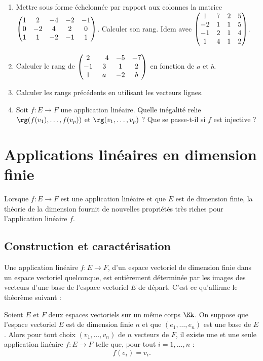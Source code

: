 \documentclass[class=report,crop=false]{standalone}
\begin{document}
\begin{miniexercices}
\begin{enumerate}
  \item Mettre sous forme échelonnée par rapport aux colonnes la matrice
  $\begin{pmatrix} 1 &2  &-4 &-2 &-1 \cr
                0 &-2 &4  &2  &0  \cr
                1 &1  &-2 &-1 &1  \cr \end{pmatrix}$. Calculer son rang.
                Idem avec
                $\begin{pmatrix} 1  &7  &2  &5  \cr
                -2 &1  &1  &5  \cr
                -1 &2  &1  &4  \cr
                1  &4  &1  &2  \cr \end{pmatrix}$.

  \item Calculer le rang de $\begin{pmatrix} 2&\phantom-4&-5&-7 \cr -1&3&1&2 \cr 1&a&-2&b \end{pmatrix}$ en fonction de
$a$ et $b$.

  \item Calculer les rangs précédents en utilisant les vecteurs lignes.

  \item Soit $f:E \to F$ une application linéaire.
Quelle inégalité relie $\rg (f(v_1), \ldots ,f(v_p))$
et $\rg (v_1, \ldots , v_p)$ ? Que se passe-t-il si $f$ est injective ?

\end{enumerate}
\end{miniexercices}




\section{Applications linéaires en dimension finie}

Lorsque $f : E \to F$ est une application linéaire et que $E$ est de dimension finie,
la théorie de la dimension fournit de nouvelles propriétés très
riches pour l'application linéaire $f$.

\subsection{Construction et caractérisation}

Une application linéaire $f : E \to F$, d'un espace vectoriel de dimension finie dans un
espace vectoriel quelconque, est entièrement déterminée par les
images des vecteurs d'une base de l'espace vectoriel $E$ de départ.
C'est ce qu'affirme le théorème suivant :
\begin{theoreme}
Soient $E$ et $F$ deux espaces vectoriels sur un même corps $\Kk$.
On suppose que l'espace vectoriel $E$ est de dimension finie $n$
et que $(e_1,\dots,e_n)$ est une base de $E$.
Alors pour tout choix $(v_1, \ldots ,v_n)$
de $n$ vecteurs de $F$, il existe une et une seule application linéaire $f : E \to F$
 telle que, pour tout $i=1,\ldots,n$ :
$$f(e_i)=v_i.$$
\end{theoreme}
\end{document}
